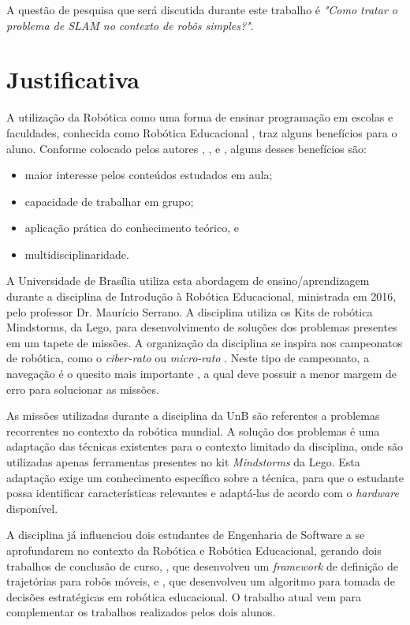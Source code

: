 	A questão de pesquisa que será discutida durante este trabalho é \textit{"Como tratar o problema de SLAM no contexto de robôs simples?"}.

\section{Justificativa}

	A utilização da Robótica como uma forma de ensinar programação em escolas e faculdades, conhecida como Robótica Educacional \cite{roboticaEducacionalAulasMatematica}, traz alguns benefícios para o aluno. Conforme colocado pelos autores \cite{teachingWithRoboticKit}, \cite{roboticEducationBasedLego}, \cite{roboticaEducacionalAulasMatematica} e \cite{evaluationRoboticEducationScale}, alguns desses benefícios são: 
	\begin{itemize}
		\item maior interesse pelos conteúdos estudados em aula;
		\item capacidade de trabalhar em grupo;
		\item aplicação prática do conhecimento teórico, e
		\item multidisciplinaridade.
	\end{itemize}
	 
	 A Universidade de Brasília utiliza esta abordagem de ensino/aprendizagem durante a disciplina de Introdução à Robótica Educacional, ministrada em 2016, pelo professor Dr. Maurício Serrano. A disciplina utiliza os Kits de robótica Mindstorms, da Lego, para desenvolvimento de soluções dos problemas presentes em um tapete de missões. A organização da disciplina se inspira nos campeonatos de robótica, como o \textit{ciber-rato} \cite{ciber-rato} ou \textit{micro-rato} \cite{roboBulldozerIV}. Neste tipo de campeonato, a navegação é o quesito mais importante \cite{ciber-rato}, a qual deve possuir a menor margem de erro para solucionar as missões.

	As missões utilizadas durante a disciplina da UnB são referentes a problemas recorrentes no contexto da robótica mundial. A solução dos problemas é uma adaptação das técnicas existentes para o contexto limitado da disciplina, onde são utilizadas apenas ferramentas presentes no kit \textit{Mindstorms} da Lego. Esta adaptação exige um conhecimento específico sobre a técnica, para que o estudante possa identificar características relevantes e adaptá-las de acordo com o \textit{hardware} disponível.

	A disciplina já influenciou dois estudantes de Engenharia de Software a se aprofundarem no contexto da Robótica e Robótica Educacional, gerando dois trabalhos de conclusão de curso, \cite{tccRodrigo}, que desenvolveu um \textit{framework} de definição de trajetórias para robôs móveis, e \cite{tccCarol}, que desenvolveu um algoritmo para tomada de decisões estratégicas em robótica educacional. O trabalho atual vem para complementar os trabalhos realizados pelos dois alunos.


